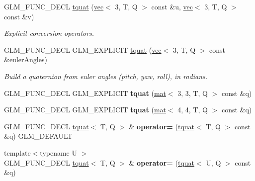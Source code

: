 \begin{DoxyCompactItemize}
\item 
G\+L\+M\+\_\+\+F\+U\+N\+C\+\_\+\+D\+E\+CL \hyperlink{structglm_1_1tquat_ad0b0aeae222fe05fb5d26fd40d74b9b6}{tquat} (\hyperlink{structglm_1_1vec}{vec}$<$ 3, T, Q $>$ const \&u, \hyperlink{structglm_1_1vec}{vec}$<$ 3, T, Q $>$ const \&v)
\begin{DoxyCompactList}\small\item\em Explicit conversion operators. \end{DoxyCompactList}\item 
\mbox{\label{structglm_1_1tquat_a98289988d4e4970f9b45132f8f33759a}} 
G\+L\+M\+\_\+\+F\+U\+N\+C\+\_\+\+D\+E\+CL G\+L\+M\+\_\+\+E\+X\+P\+L\+I\+C\+IT \hyperlink{structglm_1_1tquat_a98289988d4e4970f9b45132f8f33759a}{tquat} (\hyperlink{structglm_1_1vec}{vec}$<$ 3, T, Q $>$ const \&euler\+Angles)
\begin{DoxyCompactList}\small\item\em Build a quaternion from euler angles (pitch, yaw, roll), in radians. \end{DoxyCompactList}\item 
\mbox{\label{structglm_1_1tquat_a38ce1c324ea9484c6d4f73785c9bea35}} 
G\+L\+M\+\_\+\+F\+U\+N\+C\+\_\+\+D\+E\+CL G\+L\+M\+\_\+\+E\+X\+P\+L\+I\+C\+IT {\bfseries tquat} (\hyperlink{structglm_1_1mat}{mat}$<$ 3, 3, T, Q $>$ const \&q)
\item 
\mbox{\label{structglm_1_1tquat_adf5a3881bf63586dd6a1c26f59fee6c8}} 
G\+L\+M\+\_\+\+F\+U\+N\+C\+\_\+\+D\+E\+CL G\+L\+M\+\_\+\+E\+X\+P\+L\+I\+C\+IT {\bfseries tquat} (\hyperlink{structglm_1_1mat}{mat}$<$ 4, 4, T, Q $>$ const \&q)
\item 
\mbox{\label{structglm_1_1tquat_a2f7cf076f1398d0190228255239d9cc0}} 
G\+L\+M\+\_\+\+F\+U\+N\+C\+\_\+\+D\+E\+CL \hyperlink{structglm_1_1tquat}{tquat}$<$ T, Q $>$ \& {\bfseries operator=} (\hyperlink{structglm_1_1tquat}{tquat}$<$ T, Q $>$ const \&q) G\+L\+M\+\_\+\+D\+E\+F\+A\+U\+LT
\item 
\mbox{\label{structglm_1_1tquat_ab460ca35b5d2a4afe8fc79106943f456}} 
{\footnotesize template$<$typename U $>$ }\\G\+L\+M\+\_\+\+F\+U\+N\+C\+\_\+\+D\+E\+CL \hyperlink{structglm_1_1tquat}{tquat}$<$ T, Q $>$ \& {\bfseries operator=} (\hyperlink{structglm_1_1tquat}{tquat}$<$ U, Q $>$ const \&q)

\end{DoxyCompactItemize}
